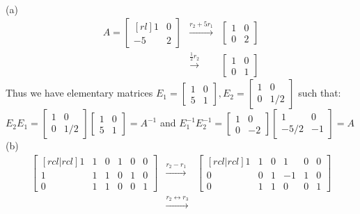 \ee
\begin{solution}\ \\
(a)
\begin{eqnarray*}
A =
\begin{bmatrix}[rl]
1&0\\
-5&2
\end{bmatrix}
&\xrightarrow[]{r_2+5r_1}&
\begin{bmatrix}
1&0\\
0&2
\end{bmatrix}\\
&\xrightarrow[]{\frac{1}{2}r_2}&
\begin{bmatrix}
1&0\\
0&1
\end{bmatrix}
\end{eqnarray*}
Thus we have elementary matrices
$E_1 =
\begin{bmatrix}
1&0\\
5&1
\end{bmatrix},
E_2 =
\begin{bmatrix}
1&0\\
0&1/2
\end{bmatrix}$ such that:\\
$E_2E_1 =
\begin{bmatrix}
1&0\\
0&1/2
\end{bmatrix}
\begin{bmatrix}
1&0\\
5&1
\end{bmatrix}
= A^{-1}
$ and $
E^{-1}_1E^{-1}_2 =
\begin{bmatrix}
1&0\\
0&-2
\end{bmatrix}
\begin{bmatrix}
1&0\\
-5/2&-1
\end{bmatrix}
= A$
\\
(b)
\begin{eqnarray*}
\begin{bmatrix}[rcl|rcl]
1&1&0&1&0&0\\
1&1&1&0&1&0\\
0&1&1&0&0&1
\end{bmatrix}
&\xrightarrow[]{r_2-r_1}&
\begin{bmatrix}[rcl|rcl]
1&1&0&1&0&0\\
0&0&1&-1&1&0\\
0&1&1&0&0&1
\end{bmatrix}\\
&\xrightarrow[]{r_2 \leftrightarrow r_3}&

\end{eqnarray*}
\end{solution}
